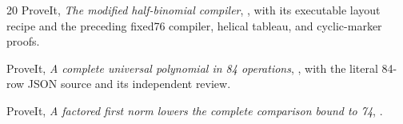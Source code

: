 \documentclass[11pt]{article}
\theoremstyle{definition}
\begin{document}
\begin{thebibliography}{20}
ProveIt, \emph{The modified half-binomial compiler},
,
with its executable layout recipe and the preceding fixed76 compiler,
helical tableau, and cyclic-marker proofs.

ProveIt, \emph{A complete universal polynomial in 84 operations},
,
with the literal 84-row JSON source and its independent review.

ProveIt, \emph{A factored first norm lowers the complete comparison bound
to 74},
.
\end{thebibliography}
\end{document}
